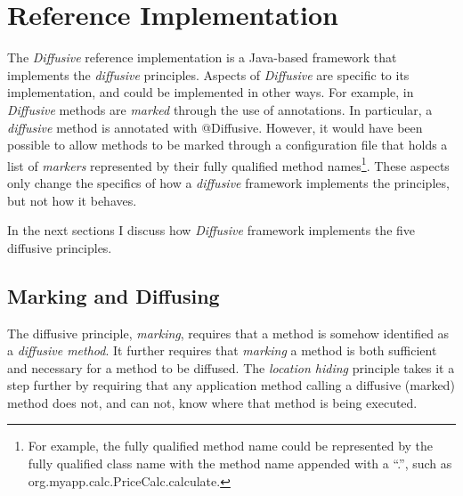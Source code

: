 \documentclass[11pt]{article}
\begin{document}
%
%
\section{Reference Implementation\label{sec:reference_implementation}}
The \emph{Diffusive} reference implementation is a Java-based framework that implements the \emph{diffusive} principles. Aspects of \emph{Diffusive} are specific to its implementation, and could be implemented in other ways. For example, in \emph{Diffusive} methods are \emph{marked} through the use of annotations. In particular, a \emph{diffusive} method is annotated with \textsf{@Diffusive}. However, it would have been possible to allow methods to be marked through a configuration file that holds a list of \emph{markers} represented by their fully qualified method names\footnote{For example, the fully qualified method name could be represented by the fully qualified class name with the method name appended with a ``.'', such as \textsf{org.myapp.calc.PriceCalc.calculate}.}. These aspects only change the specifics of how a \emph{diffusive} framework implements the principles, but not how it behaves.

In the next sections I discuss how \emph{Diffusive} framework implements the five diffusive principles.

\subsection{Marking and Diffusing\label{sec:marking_and_diffusing}}
The diffusive principle, \emph{marking}, requires that a method is somehow identified as a \emph{diffusive method}. It further requires that \emph{marking} a method is both sufficient and necessary for a method to be diffused. The \emph{location hiding} principle takes it a step further by requiring that any application method calling a diffusive (marked) method does not, and can not, know where that method is being executed.

\end{document}
